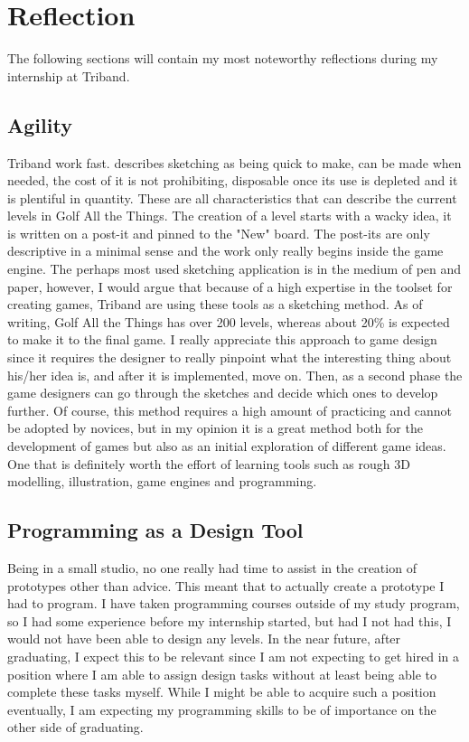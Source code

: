 \section{Reflection}
The following sections will contain my most noteworthy reflections during my internship at Triband.
\subsection{Agility}
Triband work fast.  describes sketching as being quick to make, can be made when needed, the cost of it is not prohibiting, disposable once its use is depleted and it is plentiful in quantity. These are all characteristics that can describe the current levels in Golf All the Things. The creation of a level starts with a wacky idea, it is written on a post-it and pinned to the "New" board. The post-its are only descriptive in a minimal sense and the work only really begins inside the game engine. The perhaps most used sketching application is in the medium of pen and paper, however, I would argue that because of a high expertise in the toolset for creating games, Triband are using these tools as a sketching method. As of writing, Golf All the Things has over 200 levels, whereas about 20\% is expected to make it to the final game. I really appreciate this approach to game design since it requires the designer to really pinpoint what the interesting thing about his/her idea is, and after it is implemented, move on. Then, as a second phase the game designers can go through the sketches and decide which ones to develop further. Of course, this method requires a high amount of practicing and cannot be adopted by novices, but in my opinion it is a great method both for the development of games but also as an initial exploration of different game ideas. One that is definitely worth the effort of learning tools such as rough 3D modelling, illustration, game engines and programming.
\subsection{Programming as a Design Tool}
Being in a small studio, no one really had time to assist in the creation of prototypes other than advice. This meant that to actually create a prototype I had to program. I have taken programming courses outside of my study program, so I had some experience before my internship started, but had I not had this, I would not have been able to design any levels. In the near future, after graduating, I expect this to be relevant since I am not expecting to get hired in a position where I am able to assign design tasks without at least being able to complete these tasks myself. While I might be able to acquire such a position eventually, I am expecting my programming skills to be of importance on the other side of graduating.

